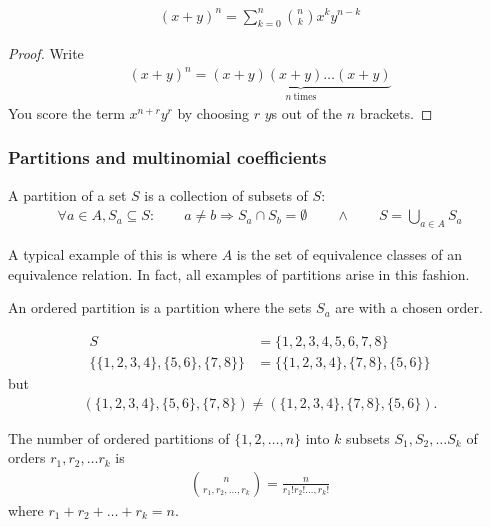 \begin{tm}
	\begin{align*}
	(x+y)^n = \sum_{k=0}^n \binom n k x^k y^{n-k}
	\end{align*}
\end{tm}

\begin{proof}
	Write
	\begin{align*}
	(x+y)^n = \underbrace{(x+y) (x+y) \dots (x+y)}_{n ~\text{times}}
	\end{align*}
	You score the term $x^{n+r} y^r$ by choosing $r$ $y$s out of the $n$ brackets.
\end{proof}

\subsubsection{Partitions and multinomial coefficients}

\begin{df}
	A partition of a set $S$ is a collection of subsets of $S$:
	\begin{align*}
	\forall a \in A, S_a \subseteq S: \qquad a\neq b \Rightarrow S_a \cap S_b = \emptyset \qquad \wedge \qquad S = \bigcup_{a\in A} S_a
	\end{align*}
\end{df}

\begin{rk}
	A typical example of this is where $A$ is the set of equivalence classes of an equivalence relation. In fact, all examples of partitions arise in this fashion.
\end{rk}

\begin{df}
An ordered partition is a partition where the sets $S_a$ are with a chosen order.
\end{df}

\begin{ex}
	\begin{align*}
	S & = \{1,2,3,4,5,6,7,8 \} \\
	\{\{1,2,3,4\}, \{5,6 \}, \{7,8 \}\} & = \{\{1,2,3,4\}, \{7,8 \}, \{5,6\}\}
	\end{align*}
	but
	\begin{align*}
	(\{1,2,3,4\}, \{5,6 \}, \{7,8 \}) \neq (\{1,2,3,4\}, \{7,8 \}, \{5,6\}).
	\end{align*}
\end{ex}

\begin{pp}
	The number of ordered partitions of $\{1,2, \dots,n\}$ into $k$ subsets $S_1, S_2, \dots S_k$ of orders $r_1, r_2, \dots r_k$ is
	\begin{align*}
	\binom n {r_1, r_2, \dots, r_k} = \frac n {r_1! r_2! \dots, r_k!}
	\end{align*}
	where $r_1+r_2+ \dots + r_k = n$.
\end{pp}

